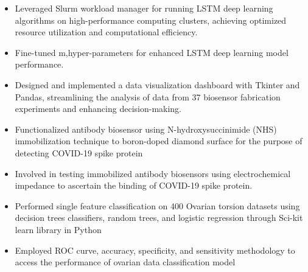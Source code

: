 \documentclass[12pt,a4paper,sans]{moderncv} %
\begin{document}
{
    \begin{itemize}
        \item Leveraged Slurm workload manager for running LSTM deep learning algorithms on high-performance computing clusters, achieving optimized resource utilization and computational efficiency. 
        \item Fine-tuned m,hyper-parameters for enhanced LSTM deep learning model performance.
    \end{itemize}
}

{
    \begin{itemize}
        \item Designed and implemented a data visualization dashboard with Tkinter and Pandas, streamlining the analysis of data from 37 biosensor fabrication experiments and enhancing decision-making.
        \item Functionalized antibody biosensor using N-hydroxysuccinimide (NHS) immobilization technique to boron-doped diamond surface for the purpose of detecting COVID-19 spike protein
        \item Involved in testing immobilized antibody biosensors using electrochemical impedance to ascertain the binding of COVID-19 spike protein.
    \end{itemize}
}

{
    \begin{itemize}
        \item Performed single feature classification on 400 Ovarian torsion datasets using decision trees classifiers, random trees, and logistic regression through Sci-kit learn library in Python
        \item Employed ROC curve, accuracy, specificity, and sensitivity methodology to access the performance of ovarian data classification model
    \end{itemize}
}

\end{document}
